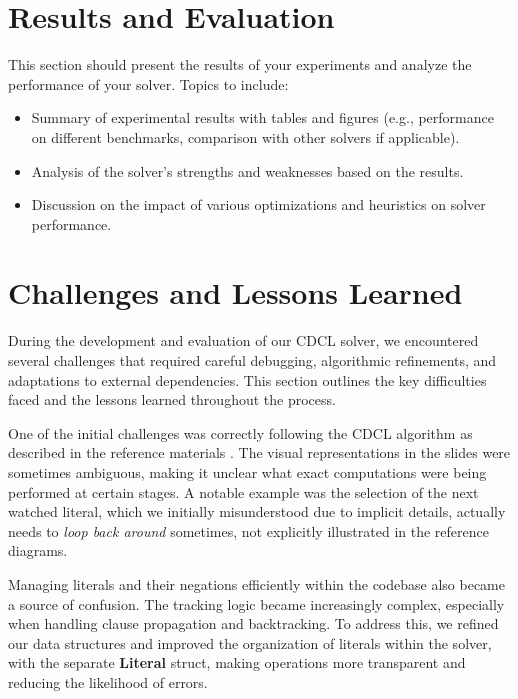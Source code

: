 \documentclass[a4paper,12pt]{article}
\begin{document}
\section{Results and Evaluation}
\label{sec:results}
This section should present the results of your experiments and analyze the performance of your solver. Topics to include:
\begin{itemize}
    \item Summary of experimental results with tables and figures (e.g., performance on different benchmarks, comparison with other solvers if applicable).
    \item Analysis of the solver’s strengths and weaknesses based on the results.
    \item Discussion on the impact of various optimizations and heuristics on solver performance.
\end{itemize}

\section{Challenges and Lessons Learned}
\label{sec:challenges}

During the development and evaluation of our CDCL solver, we encountered several challenges that
required careful debugging, algorithmic refinements, and adaptations to external dependencies.
This section outlines the key difficulties faced and the lessons learned throughout the process.

One of the initial challenges was correctly following the CDCL algorithm as described in the
reference materials \cite{CdclTwoWatchedSlides}. The visual representations in the slides were
sometimes ambiguous, making it unclear what exact computations were being performed at certain
stages. A notable example was the selection of the next watched literal, which we initially
misunderstood due to implicit details, actually needs to \textit{loop back around} sometimes,
not explicitly illustrated in the reference diagrams.

Managing literals and their negations efficiently within the codebase also became a source of
confusion. The tracking logic became increasingly complex, especially when handling clause
propagation and backtracking. To address this, we refined our data structures and improved
the organization of literals within the solver, with the separate \textbf{Literal} struct,
making operations more transparent and reducing the likelihood of errors.
\end{document}
